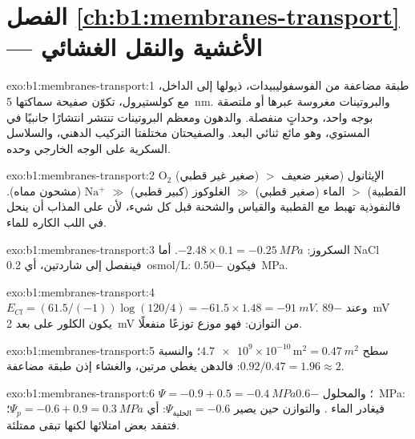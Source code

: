 \section*{الفصل \ref{ch:b1:membranes-transport} --- الأغشية والنقل الغشائي}

\begin{solution}{exo:b1:membranes-transport:1}
طبقة مضاعفة من الفوسفوليبيدات، ذيولها إلى الداخل، مع كولستيرول، تكوّن
صفيحة سماكتها \qty{5}{nm}. والبروتينات مغروسة عبرها أو ملتصقة بوجه
واحد، وحداتٍ منفصلة. والدهون ومعظم البروتينات تنتشر انتشارًا جانبيًا
في المستوي، وهو مائع ثنائي البعد. والصفيحتان مختلفتا التركيب الدهني،
والسلاسل السكرية على الوجه الخارجي وحده.
\end{solution}

\begin{solution}{exo:b1:membranes-transport:2}
$\mathrm{O_2}$ (صغير غير قطبي) $>$ الإيثانول (صغير ضعيف القطبية)
$>$ الماء (صغير قطبي) $\gg$ الغلوكوز (كبير قطبي) $\gg$
$\mathrm{Na^+}$ (مشحون مماه). فالنفوذية تهبط مع القطبية والقياس
والشحنة قبل كل شيء، لأن على المذاب أن ينحل في اللب الكاره للماء.
\end{solution}

\begin{solution}{exo:b1:membranes-transport:3}
السكروز: $-2.48\times 0.1 = \qty{-0.25}{MPa}$. أما NaCl فينفصل إلى
شاردتين، أي \qty{0.2}{osmol/L}: فيكون \qty{-0.50}{MPa}.
\end{solution}

\begin{solution}{exo:b1:membranes-transport:4}
$E_{Cl} = (61.5/(-1))\log(120/4) = -61.5\times 1.48 = \qty{-91}{mV}$.
وعند \qty{-89}{mV} يكون الكلور على بعد \qty{2}{mV} من التوازن: فهو
موزع توزعًا منفعلًا.
\end{solution}

\begin{solution}{exo:b1:membranes-transport:5}
سطح  $\num{4.7e9}\times 10^{-10}\,\mathrm{m^2} =
\qty{0.47}{m^2}$؛ والنسبة $0.92/0.47 = 1.96 \approx 2$: فالدهن يغطي
 مرتين، والغشاء إذن طبقة مضاعفة.
\end{solution}

\begin{solution}{exo:b1:membranes-transport:6}
 $\Psi = -0.9 + 0.5 = \qty{-0.4}{MPa}$؛ والمحلول
\qty{-0.6}{MPa}: فيغادر الماء . والتوازن حين يصير
$\Psi_{\text{الخلية}} = -0.6$: أي
$\Psi_p = -0.6 + 0.9 = \qty{0.3}{MPa}$؛ فتفقد  بعض امتلائها
لكنها تبقى ممتلئة.
\end{solution}

